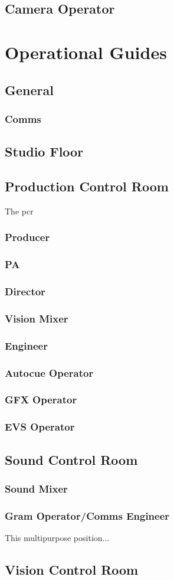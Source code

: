 \documentclass[7pt,a5paper]{book}
\begin{document}
\newpage
\section{Camera Operator}









\chapter{Operational Guides}
\section{General}
\subsection{Comms}
\section{Studio Floor}
\section{Production Control Room}
The \gls{pcr}
\subsection{Producer}
\subsection{PA}
\subsection{Director}
\subsection{Vision Mixer}
\subsection{Engineer}
\subsection{Autocue Operator}
\subsection{GFX Operator}
\subsection{EVS Operator}
\section{Sound Control Room}
\subsection{Sound Mixer}
\subsection{Gram Operator/Comms Engineer}
This multipurpose position...
\section{Vision Control Room}
\end{document}
